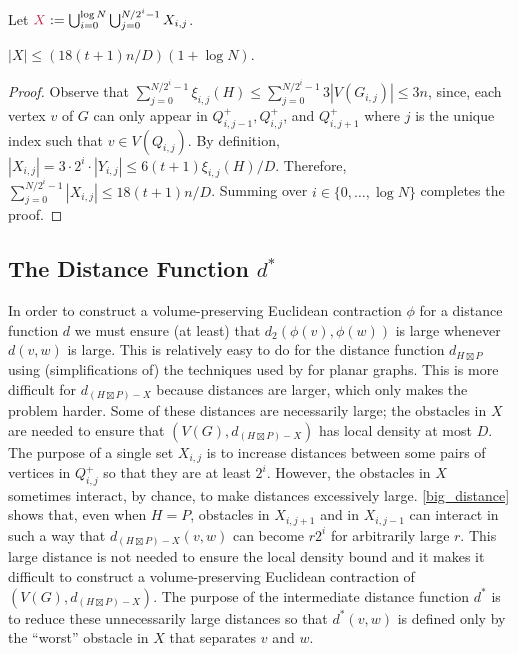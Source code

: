 \documentclass{patmorin}
\makeatletter
\renewcommand{\le}{\leqslant}
\def\mathcolor#1#{\@mathcolor{#1}}
\def\@mathcolor#1#2#3{%
  \protect\leavevmode
  \begingroup
    \color#1{#2}#3%
  \endgroup
}
\newcommand{\mathdefin}[1]{\mathcolor{brightmaroon}{#1}}
\makeatother
\begin{document}
Let $\mathdefin{X}:=\bigcup_{i=0}^{\log N}\bigcup_{j=0}^{N/2^i-1} X_{i,j}$.

\begin{lem}\label{x_size}
  $|X|\le (18(t+1)n/D)(1+\log N)$.
\end{lem}

\begin{proof}
  Observe that $\sum_{j=0}^{N/2^i-1} \xi_{i,j}(H)\le\sum_{j=0}^{N/2^i-1} 3|V(G_{i,j})| \le 3n$, since, each vertex $v$ of $G$ can only appear in $Q^+_{i,j-1}, Q^+_{i,j}$, and $Q^+_{i,j+1}$ where $j$ is the unique index such that $v\in V(Q_{i,j})$.    By definition, $|X_{i,j}|=3\cdot 2^i \cdot |Y_{i,j}| \le 6(t+1)\xi_{i,j}(H)/D$.  Therefore, $\sum_{j=0}^{N/2^i-1} |X_{i,j}|\le 18(t+1)n/D$. Summing over $i\in\{0,\ldots,\log N\}$ completes the proof.
\end{proof}

\subsection{\boldmath The Distance Function $d^*$}
\label{d_star_definition}

In order to construct a volume-preserving Euclidean contraction $\phi$ for a distance function $d$ we must ensure (at least) that $d_2(\phi(v),\phi(w))$ is large whenever $d(v,w)$ is large.  This is relatively easy to do for the distance function $d_{H\boxtimes P}$ using (simplifications of) the techniques used by \citet{rao:small} for planar graphs. This is more difficult for $d_{(H\boxtimes P)-X}$ because distances are larger, which only makes the problem harder.  Some of these distances are necessarily large; the obstacles in $X$ are needed to ensure that $(V(G),d_{(H\boxtimes P)-X})$ has local density at most $D$.  The purpose of a single set $X_{i,j}$ is to increase distances between some pairs of vertices in $Q^+_{i,j}$ so that they are at least $2^i$.  However, the obstacles in $X$ sometimes interact, by chance, to make distances excessively large. \cref{big_distance} shows that, even when $H=P$, obstacles in $X_{i,j+1}$ and in $X_{i,j-1}$ can interact in such a way that $d_{(H\boxtimes P)-X}(v,w)$ can become $r2^i$ for arbitrarily large $r$.  This large distance is not needed to ensure the local density bound and it makes it difficult to construct a volume-preserving Euclidean contraction of $(V(G),d_{(H\boxtimes P)-X})$.  The purpose of the intermediate distance function $d^*$ is to reduce these unnecessarily large distances so that $d^*(v,w)$ is defined only by the ``worst'' obstacle in $X$ that separates $v$ and $w$.
\end{document}
